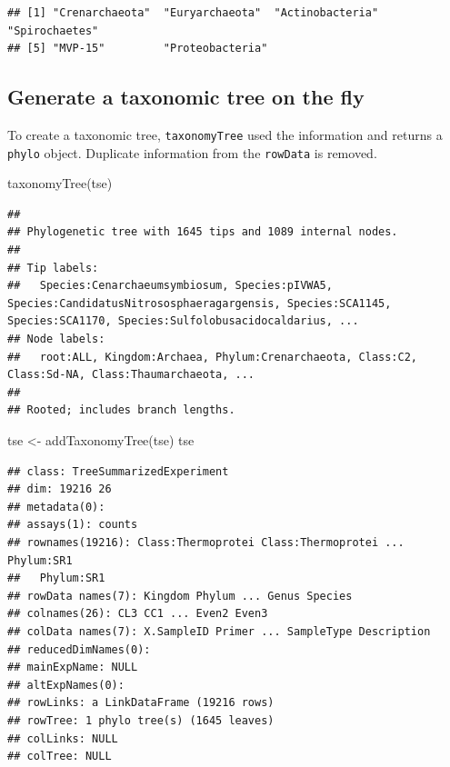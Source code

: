 \documentclass[
]{book}
\newenvironment{Shaded}{\begin{snugshade}}{\end{snugshade}}
\newcommand{\FunctionTok}[1]{\textcolor[rgb]{0.00,0.00,0.00}{#1}}
\newcommand{\NormalTok}[1]{#1}
\newcommand{\OtherTok}[1]{\textcolor[rgb]{0.56,0.35,0.01}{#1}}
\begin{document}
\begin{verbatim}
## [1] "Crenarchaeota"  "Euryarchaeota"  "Actinobacteria" "Spirochaetes"  
## [5] "MVP-15"         "Proteobacteria"
\end{verbatim}

\hypertarget{generate-a-taxonomic-tree-on-the-fly}{%
\subsection{Generate a taxonomic tree on the fly}\label{generate-a-taxonomic-tree-on-the-fly}}

To create a taxonomic tree, \texttt{taxonomyTree} used the information and returns a
\texttt{phylo} object. Duplicate information from the \texttt{rowData} is removed.

\begin{Shaded}
\begin{Highlighting}[]
\FunctionTok{taxonomyTree}\NormalTok{(tse)}
\end{Highlighting}
\end{Shaded}

\begin{verbatim}
## 
## Phylogenetic tree with 1645 tips and 1089 internal nodes.
## 
## Tip labels:
##   Species:Cenarchaeumsymbiosum, Species:pIVWA5, Species:CandidatusNitrososphaeragargensis, Species:SCA1145, Species:SCA1170, Species:Sulfolobusacidocaldarius, ...
## Node labels:
##   root:ALL, Kingdom:Archaea, Phylum:Crenarchaeota, Class:C2, Class:Sd-NA, Class:Thaumarchaeota, ...
## 
## Rooted; includes branch lengths.
\end{verbatim}

\begin{Shaded}
\begin{Highlighting}[]
\NormalTok{tse }\OtherTok{\textless{}{-}} \FunctionTok{addTaxonomyTree}\NormalTok{(tse)}
\NormalTok{tse}
\end{Highlighting}
\end{Shaded}

\begin{verbatim}
## class: TreeSummarizedExperiment 
## dim: 19216 26 
## metadata(0):
## assays(1): counts
## rownames(19216): Class:Thermoprotei Class:Thermoprotei ... Phylum:SR1
##   Phylum:SR1
## rowData names(7): Kingdom Phylum ... Genus Species
## colnames(26): CL3 CC1 ... Even2 Even3
## colData names(7): X.SampleID Primer ... SampleType Description
## reducedDimNames(0):
## mainExpName: NULL
## altExpNames(0):
## rowLinks: a LinkDataFrame (19216 rows)
## rowTree: 1 phylo tree(s) (1645 leaves)
## colLinks: NULL
## colTree: NULL
\end{verbatim}
\end{document}
